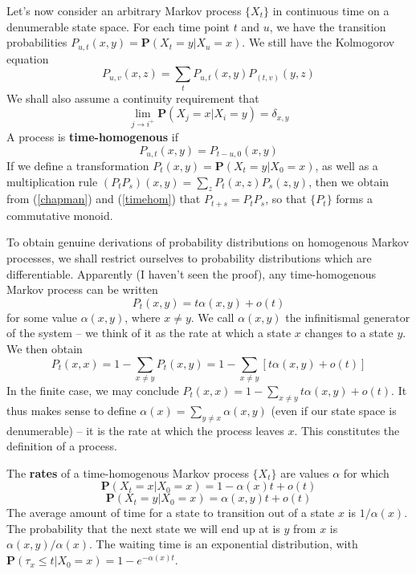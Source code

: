 Let's now consider an arbitrary Markov process $\{ X_t \}$ in continuous time on a denumerable state space. For each time point $t$ and $u$, we have the transition probabilities $P_{u,t}(x,y) = \mathbf{P}(X_t = y | X_u = x)$. We still have the Kolmogorov equation
%
\begin{equation} \label{chapman} P_{u,v}(x,z) = \sum_t P_{u,t}(x,y) P_(t,v)(y,z) \end{equation}
%
We shall also assume a continuity requirement that
%
\begin{equation} \label{continuity} \lim_{j \to i^+} \mathbf{P}(X_j = x | X_i = y) = \delta_{x,y} \end{equation}
%
A process is {\bf time-homogenous} if
%
\begin{equation} \label{timehom} P_{u,t}(x,y) = P_{t-u,0}(x,y) \end{equation}
%
If we define a transformation $P_t(x,y) = \mathbf{P}(X_t = y | X_0 = x)$, as well as a multiplication rule $(P_t P_s)(x,y) = \sum_z P_t(x,z) P_s(z,y)$, then we obtain from (\ref{chapman}) and (\ref{timehom}) that $P_{t+s} = P_t P_s$, so that $\{ P_t \}$ forms a commutative monoid.

To obtain genuine derivations of probability distributions on homogenous Markov processes, we shall restrict ourselves to probability distributions which are differentiable. Apparently (I haven't seen the proof), any time-homogenous Markov process can be written
%
\[ P_t(x,y) = t \alpha(x,y) + o(t) \]
%
for some value $\alpha(x,y)$, where $x \neq y$. We call $\alpha(x,y)$ the infinitismal generator of the system -- we think of it as the rate at which a state $x$ changes to a state $y$. We then obtain
%
\[ P_t(x,x) = 1 - \sum_{x \neq y} P_t(x,y) = 1 - \sum_{x \neq y} [t \alpha(x,y) + o(t)] \]
%
In the finite case, we may conclude $P_t(x,x) = 1 - \sum_{x \neq y} t \alpha(x,y) + o(t)$. It thus makes sense to define $\alpha(x) = \sum_{y \neq x} \alpha(x,y)$ (even if our state space is denumerable) -- it is the rate at which the process leaves $x$. This constitutes the definition of a process.

\begin{definition}
    The {\bf rates} of a time-homogenous Markov process $\{ X_t \}$ are values $\alpha$ for which
    \[ \mathbf{P}(X_t = x | X_0 = x) = 1 - \alpha(x) t + o(t) \]
    \[ \mathbf{P}(X_t = y | X_0 = x) = \alpha(x,y) t + o(t) \]
    The average amount of time for a state to transition out of a state $x$ is $1/\alpha(x)$. The probability that the next state we will end up at is $y$ from $x$ is $\alpha(x,y)/\alpha(x)$. The waiting time is an exponential distribution, with $\mathbf{P}(\tau_x \leq t | X_0 = x) = 1 - e^{-\alpha(x)t}$.
\end{definition}


